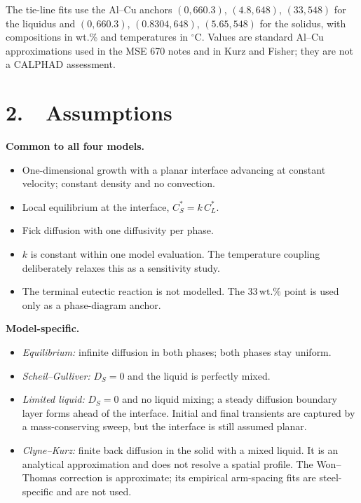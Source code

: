 \documentclass[11pt,a4paper]{article}
\newcommand{\wtpct}{\,\mathrm{wt.\%}}
\begin{document}
The tie-line fits use the Al--Cu anchors $(0,660.3)$, $(4.8,648)$, $(33,548)$
for the liquidus and $(0,660.3)$, $(0.8304,648)$, $(5.65,548)$ for the
solidus, with compositions in wt.\% and temperatures in $^\circ$C. Values are
standard Al--Cu approximations used in the MSE 670 notes and in Kurz and
Fisher; they are not a CALPHAD assessment.

\section*{2.\ \ Assumptions}

\textbf{Common to all four models.}
\begin{itemize}[leftmargin=1.3em,itemsep=0.05em,topsep=0.1em]
  \item One-dimensional growth with a planar interface advancing at constant
        velocity; constant density and no convection.
  \item Local equilibrium at the interface, $C_S^*=k\,C_L^*$.
  \item Fick diffusion with one diffusivity per phase.
  \item $k$ is constant within one model evaluation. The temperature coupling
        deliberately relaxes this as a sensitivity study.
  \item The terminal eutectic reaction is not modelled. The $33\wtpct$ point
        is used only as a phase-diagram anchor.
\end{itemize}

\textbf{Model-specific.}
\begin{itemize}[leftmargin=1.3em,itemsep=0.05em,topsep=0.1em]
  \item \emph{Equilibrium:} infinite diffusion in both phases; both phases stay
        uniform.
  \item \emph{Scheil--Gulliver:} $D_S=0$ and the liquid is perfectly mixed.
  \item \emph{Limited liquid:} $D_S=0$ and no liquid mixing; a steady diffusion
        boundary layer forms ahead of the interface. Initial and final
        transients are captured by a mass-conserving sweep, but the interface
        is still assumed planar.
  \item \emph{Clyne--Kurz:} finite back diffusion in the solid with a mixed
        liquid. It is an analytical approximation and does not resolve a
        spatial profile. The Won--Thomas correction is approximate; its
        empirical arm-spacing fits are steel-specific and are not used.
\end{itemize}
\end{document}
